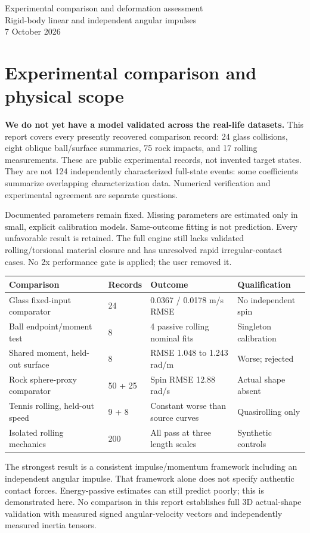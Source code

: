 \documentclass[10pt,a4paper]{article}
\begin{document}
\begin{center}\Large Experimental comparison and deformation assessment\\[4pt]
\normalsize Rigid-body linear and independent angular impulses\\7 October 2026\end{center}
\section*{Experimental comparison and physical scope}

\textbf{We do not yet have a model validated across the real-life datasets.}
This report covers every presently recovered comparison record: 24 glass collisions,
eight oblique ball/surface summaries, 75 rock impacts, and 17 rolling measurements.
These are public experimental records, not invented target states. They are not
124 independently characterized full-state events: some coefficients summarize
overlapping characterization data. Numerical verification and experimental agreement
are separate questions.

Documented parameters remain fixed. Missing parameters are estimated only in small,
explicit calibration models. Same-outcome fitting is not prediction. Every unfavorable
result is retained. The full engine still lacks validated rolling/torsional material
closure and has unresolved rapid irregular-contact cases. No 2x performance gate is
applied; the user removed it.
\begin{center}\footnotesize\setlength{\tabcolsep}{4pt}
\begin{tabular}{llll}
\hline
Comparison & Records & Outcome & Qualification\\\hline
Glass fixed-input comparator & 24 & 0.0367 / 0.0178 m/s RMSE & No independent spin\\
Ball endpoint/moment test & 8 & 4 passive rolling nominal fits & Singleton calibration\\
Shared moment, held-out surface & 8 & RMSE 1.048 to 1.243 rad/m & Worse; rejected\\
Rock sphere-proxy comparator & 50 + 25 & Spin RMSE 12.88 rad/s & Actual shape absent\\
Tennis rolling, held-out speed & 9 + 8 & Constant worse than source curves & Quasirolling only\\
Isolated rolling mechanics & 200 & All pass at three length scales & Synthetic controls\\
\hline\end{tabular}\end{center}
The strongest result is a consistent impulse/momentum framework including an
independent angular impulse. That framework alone does not specify authentic contact
forces. Energy-passive estimates can still predict poorly; this is demonstrated here.
No comparison in this report establishes full 3D actual-shape validation with measured
signed angular-velocity vectors and independently measured inertia tensors.
\end{document}
